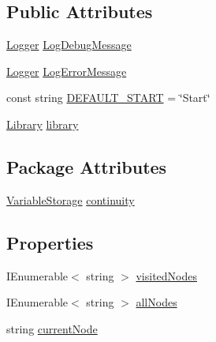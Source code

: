 \subsection*{Public Attributes}
\begin{DoxyCompactItemize}
\item 
\hyperlink{a00040_a1e50031b945a3a2afafee6f590730568}{Logger} \hyperlink{a00050_a381f48bb0fbb294f8cf44ca57f11be31}{Log\-Debug\-Message}
\item 
\hyperlink{a00040_a1e50031b945a3a2afafee6f590730568}{Logger} \hyperlink{a00050_a9801e83dd044d6498fdf6ebcc6bec5ac}{Log\-Error\-Message}
\item 
const string \hyperlink{a00050_a1b643f15f734090e6a58cbf13dafd28f}{D\-E\-F\-A\-U\-L\-T\-\_\-\-S\-T\-A\-R\-T} = \char`\"{}Start\char`\"{}
\item 
\hyperlink{a00063}{Library} \hyperlink{a00050_ae660d4cfb6e296358d2f61d8ee74c66a}{library}
\end{DoxyCompactItemize}
\subsection*{Package Attributes}
\begin{DoxyCompactItemize}
\item 
\hyperlink{a00102}{Variable\-Storage} \hyperlink{a00050_ae94eaa4b03b432422f5d205fabe37ff5}{continuity}
\end{DoxyCompactItemize}
\subsection*{Properties}
\begin{DoxyCompactItemize}
\item 
I\-Enumerable$<$ string $>$ \hyperlink{a00050_ac5661051e0b7f44527fe526c7766dbbf}{visited\-Nodes}
\item 
I\-Enumerable$<$ string $>$ \hyperlink{a00050_a0ee573e3d072bccf98ba1d975612d42c}{all\-Nodes}
\item 
string \hyperlink{a00050_af368b5c342d585dc6953876c5965ccc8}{current\-Node}
\end{DoxyCompactItemize}
